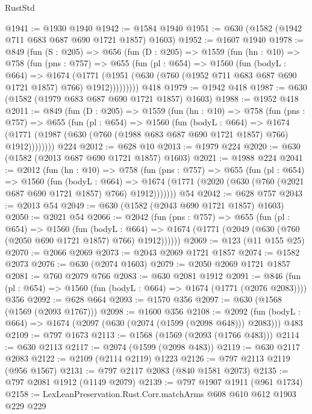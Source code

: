 \begin{lexlean}{RustStd}
\begin{coremodule}
{\begin{coremodule}
{{{{{{{{{{@1941 := @1930 @1940
@1942 := @1584 @1940
@1951 := @630 (@1582 (@1942 @711 @683 @687 @690 @1721 @1857) @1603)
@1952 := @1607 @1940
@1978 := @849
    (fun (S : @205) =>
    @656
      (fun (D : @205) =>
      @1559
        (fun (hn : @10) =>
        @758
          (fun (pns : @757) =>
          @655
            (fun (pl : @654) =>
            @1560
              (fun (bodyL : @664) =>
              @1674
                (@1771
                  (@1951 (@630 (@760 (@1952 @711 @683 @687 @690 @1721 @1857) @766) @1912)))))))))
    @418
@1979 := @1942 @418
@1987 := @630 (@1582 (@1979 @683 @687 @690 @1721 @1857) @1603)
@1988 := @1952 @418
@2011 := @849
    (fun (D : @205) =>
    @1559
      (fun (hn : @10) =>
      @758
        (fun (pns : @757) =>
        @655
          (fun (pl : @654) =>
          @1560
            (fun (bodyL : @664) =>
            @1674 (@1771 (@1987 (@630 (@760 (@1988 @683 @687 @690 @1721 @1857) @766) @1912))))))))
    @224
@2012 := @628 @10
@2013 := @1979 @224
@2020 := @630 (@1582 (@2013 @687 @690 @1721 @1857) @1603)
@2021 := @1988 @224
@2041 := @2012
    (fun (hn : @10) =>
    @758
      (fun (pns : @757) =>
      @655
        (fun (pl : @654) =>
        @1560
          (fun (bodyL : @664) =>
          @1674 (@1771 (@2020 (@630 (@760 (@2021 @687 @690 @1721 @1857) @766) @1912)))))))
    @54
@2042 := @628 @757
@2043 := @2013 @54
@2049 := @630 (@1582 (@2043 @690 @1721 @1857) @1603)
@2050 := @2021 @54
@2066 := @2042
    (fun (pns : @757) =>
    @655
      (fun (pl : @654) =>
      @1560
        (fun (bodyL : @664) =>
        @1674 (@1771 (@2049 (@630 (@760 (@2050 @690 @1721 @1857) @766) @1912))))))
@2069 := @123 (@11 @155 @25)
@2070 := @2066 @2069
@2073 := @2043 @2069 @1721 @1857
@2074 := @1582 @2073
@2076 := @630 (@2074 @1603)
@2079 := @2050 @2069 @1721 @1857
@2081 := @760 @2079 @766
@2083 := @630 @2081 @1912
@2091 := @846 (fun (pl : @654) => @1560 (fun (bodyL : @664) => @1674 (@1771 (@2076 @2083)))) @356
@2092 := @628 @664
@2093 := @1570 @356
@2097 := @630 (@1568 (@1569 (@2093 @1767)))
@2098 := @1600 @356
@2108 := @2092 (fun (bodyL : @664) => @1674 (@2097 (@630 (@2074 (@1599 (@2098 @648))) @2083))) @483
@2109 := @797 @1673
@2113 := @1568 (@1569 (@2093 (@1766 @483)))
@2114 := @630 @2113
@2117 := @2074 (@1599 (@2098 @483))
@2119 := @630 @2117 @2083
@2122 := @2109 (@2114 @2119) @1223
@2126 := @797 @2113 @2119 (@956 @1567)
@2131 := @797 @2117 @2083 (@840 @1581 @2073)
@2135 := @797 @2081 @1912 (@1149 @2079)
@2139 := @797 @1907 @1911 (@961 @1734)
@2158 := LexLeanPreservation.Rust.Corr.matchArms
    @608
    @610
    @612
    @1903
    @229
    @229
}}}}}}}}}}
\end{coremodule}}
\end{coremodule}
\end{lexlean}
